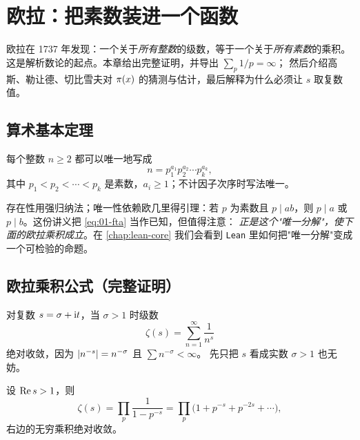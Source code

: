 \chapter{欧拉：把素数装进一个函数}
\label{chap:euler}

\begin{keybox}[本章要点]
欧拉在 1737 年发现：一个关于\emph{所有整数}的级数，等于一个关于\emph{所有素数}的乘积。
这是解析数论的起点。本章给出完整证明，并导出 $\sum_p 1/p=\infty$；
然后介绍高斯、勒让德、切比雪夫对 $\pi(x)$ 的猜测与估计，最后解释为什么必须让 $s$ 取复数值。
\end{keybox}

\section{算术基本定理}
\label{sec:01-fta}

\begin{theorem}[算术基本定理]
每个整数 $n\ge 2$ 都可以唯一地写成
\begin{equation}\label{eq:01-fta}
  n=p_1^{a_1}p_2^{a_2}\cdots p_k^{a_k},
\end{equation}
其中 $p_1<p_2<\cdots<p_k$ 是素数，$a_i\ge 1$；不计因子次序时写法唯一。
\end{theorem}

存在性用强归纳法；唯一性依赖欧几里得引理：若 $p$ 为素数且 $p\mid ab$，则
$p\mid a$ 或 $p\mid b$。这份讲义把 \cref{eq:01-fta} 当作已知，但值得注意：
\emph{正是这个"唯一分解"，使下面的欧拉乘积成立}。在 \cref{chap:lean-core}
我们会看到 \texttt{Lean} 里如何把"唯一分解"变成一个可检验的命题。

\section{欧拉乘积公式（完整证明）}
\label{sec:01-euler-product}

\begin{definition}
对复数 $s=\sigma+\mathrm{i} t$，当 $\sigma>1$ 时级数
\begin{equation}\label{eq:01-zeta}
  \zeta(s)=\sum_{n=1}^{\infty}\frac{1}{n^{s}}
\end{equation}
绝对收敛，因为 $\left\lvert n^{-s}\right\rvert=n^{-\sigma}$ 且 $\sum n^{-\sigma}<\infty$。
先只把 $s$ 看成实数 $\sigma>1$ 也无妨。
\end{definition}

\begin{theorem}\label{thm:01-euler}
设 $\operatorname{Re} s>1$，则
\begin{equation}\label{eq:01-prod}
  \zeta(s)=\prod_{p}\frac{1}{1-p^{-s}}
  =\prod_p\bigl(1+p^{-s}+p^{-2s}+\cdots\bigr),
\end{equation}
右边的无穷乘积绝对收敛。
\end{theorem}

